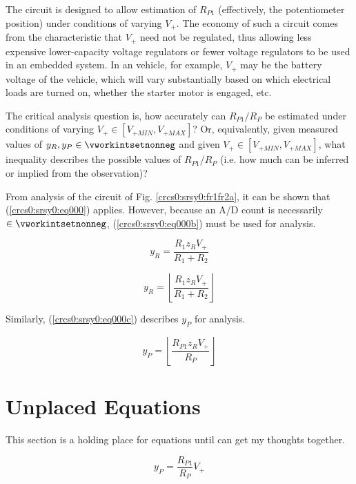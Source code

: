 The circuit is designed to allow
estimation of $R_{P1}$ (effectively, the potentiometer position)
under conditions of varying $V_{+}$.  The economy of such a circuit
comes from the characteristic that $V_{+}$ need not be regulated,
thus allowing less expensive lower-capacity voltage regulators or
fewer voltage regulators to be used in an embedded system.
In an vehicle, for example, $V_{+}$ may be the battery voltage of
the vehicle, which will vary substantially based on which
electrical loads are turned on, whether the starter motor is
engaged, etc.

The critical analysis question is,
how accurately can $R_{P1}/R_P$ be estimated under conditions
of varying $V_{+} \in [V_{+MIN}, V_{+MAX}]$?  Or, equivalently,
given measured values of $y_R, y_P \in \vworkintsetnonneg$
and given $V_{+} \in [V_{+MIN}, V_{+MAX}]$,
what inequality describes the possible values of $R_{P1}/R_P$
(i.e. how much can be inferred or implied from the observation)?


From analysis of the circuit of Fig. \ref{crcs0:srsy0:fr1fr2a},
it can be shown that (\ref{crcs0:srsy0:eq000}) applies.
However, because an A/D
count is necessarily $\in \vworkintsetnonneg$, (\ref{crcs0:srsy0:eq000b}) must be
used for analysis.

\begin{equation}
\label{crcs0:srsy0:eq000}
y_R = \frac{R_1 z_R V_{+}}{R_1 + R_2}
\end{equation}

\begin{equation}
\label{crcs0:srsy0:eq000b}
y_R = \left\lfloor\frac{R_1 z_R V_{+}}{R_1 + R_2}\right\rfloor
\end{equation}

Similarly, (\ref{crcs0:srsy0:eq000c}) describes $y_P$ for analysis.

\begin{equation}
\label{crcs0:srsy0:eq000c}
y_P = \left\lfloor\frac{R_{P1} z_R V_{+}}{R_P}\right\rfloor
\end{equation}


\section{Unplaced Equations}

This section is a holding place for equations until can get my
thoughts together.

\begin{equation}
y_P = \frac{R_{P1}}{R_P} V_{+}
\end{equation}

